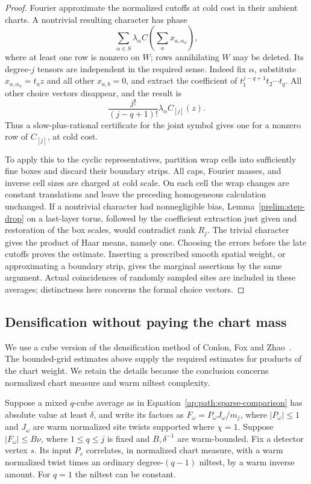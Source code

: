 \begin{proof}
Fourier approximate the normalized cutoffs at cold cost in their
ambient charts.  A nontrivial resulting character has phase
\[
 \sum_{\alpha\in S}\lambda_\alpha
       C\left(\sum_a x_{a,\alpha_a}\right),
\]
where at least one row is nonzero on $W$; rows annihilating $W$
may be deleted.  Its degree-$j$ tensors are independent in the
required sense.  Indeed fix $\alpha$, substitute
$x_{a,\alpha_a}=t_a z$ and all other $x_{a,b}=0$, and extract
the coefficient of $t_1^{j-q+1}t_2\cdots t_q$.  All other
choice vectors disappear, and the result is
\[
 \frac{j!}{(j-q+1)!}\lambda_\alpha C_{[j]}(z).
\]
Thus a slow-plus-rational certificate for the joint symbol gives
one for a nonzero row of $C_{[j]}$, at cold cost.

To apply this to the cyclic representatives, partition wrap cells
into sufficiently fine boxes and discard their boundary strips.
All caps, Fourier masses, and inverse cell sizes are charged at
cold scale.  On each cell the wrap changes are constant
translations and leave the preceding homogeneous calculation
unchanged.  If a nontrivial character had nonnegligible bias,
Lemma~\ref{prelim:step-drop} on a last-layer torus, followed by
the coefficient extraction just given and restoration of the box
scales, would contradict rank $R_j$.  The trivial character gives
the product of Haar means, namely one.  Choosing the errors before
the late cutoffs proves the estimate.  Inserting a prescribed
smooth spatial weight, or approximating a boundary strip, gives
the marginal assertions by the same argument.  Actual coincidences
of randomly sampled sites are included in these averages; distinctness
here concerns the formal choice vectors.
\end{proof}

\subsection{Densification without paying the chart mass}

We use a cube version of the densification method of
Conlon, Fox and Zhao~\cite[Sections~6.2--6.3]{ConlonFoxZhao2015}.
The bounded-grid estimates above supply the required estimates
for products of the chart weight. We retain the details because
the conclusion concerns normalized chart measure and warm
niltest complexity.

\begin{lemma}\label{ap:path:relative-cube}
Suppose a mixed $q$-cube average as in
Equation~\eqref{ap:path:sparse-comparison} has absolute value at
least $\delta$, and write its factors as
$F_\omega=P_\omega J_\omega/m_j$, where $|P_\omega|\le1$
and $J_\omega$ are warm normalized site twists supported where
$\chi=1$.  Suppose $|F_\omega|\le B\nu$, where $1\le q\le j$
is fixed and $B,\delta^{-1}$ are warm-bounded.  Fix a detector
vertex $s$.  Its input $P_s$ correlates, in normalized chart measure, with
a warm normalized twist times an ordinary degree-$(q-1)$ niltest,
by a warm inverse amount.  For $q=1$ the niltest can be constant.
\end{lemma}


